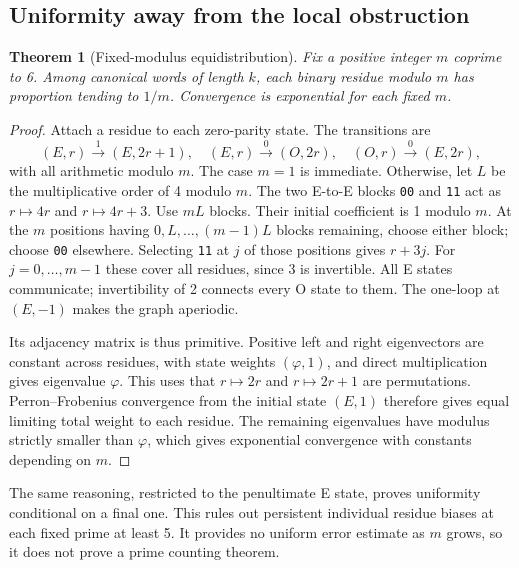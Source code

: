 \documentclass[11pt]{article}
\newtheorem{theorem}{Theorem}[section]
\theoremstyle{definition}\newtheorem{definition}[theorem]{Definition}
\newcommand{\ph}{\varphi}
\begin{document}
\subsection{Uniformity away from the local obstruction}
\begin{theorem}[Fixed-modulus equidistribution]
Fix a positive integer $m$ coprime to 6. Among canonical words of length
$k$, each binary residue modulo $m$ has proportion tending to $1/m$.
Convergence is exponential for each fixed $m$.
\end{theorem}
\begin{proof}
Attach a residue to each zero-parity state. The transitions are
\[
(E,r)\xrightarrow{1}(E,2r+1),\quad
(E,r)\xrightarrow{0}(O,2r),\quad
(O,r)\xrightarrow{0}(E,2r),
\]
with all arithmetic modulo $m$. The case $m=1$ is immediate. Otherwise,
let $L$ be the multiplicative order of 4 modulo $m$. The two E-to-E
blocks \texttt{00} and \texttt{11} act as $r\mapsto4r$ and
$r\mapsto4r+3$. Use $mL$ blocks. Their initial coefficient is 1 modulo
$m$. At the $m$ positions having $0,L,\ldots,(m-1)L$ blocks remaining,
choose either block; choose \texttt{00} elsewhere. Selecting \texttt{11}
at $j$ of those positions gives $r+3j$. For $j=0,\ldots,m-1$ these
cover all residues, since 3 is invertible. All E states communicate;
invertibility of 2 connects every O state to them. The one-loop at
$(E,-1)$ makes the graph aperiodic.

Its adjacency matrix is thus primitive. Positive left and right
eigenvectors are constant across residues, with state weights
$(\ph,1)$, and direct multiplication gives eigenvalue $\ph$.
This uses that $r\mapsto2r$ and $r\mapsto2r+1$ are permutations.
Perron--Frobenius convergence from the initial state $(E,1)$ therefore
gives equal limiting total weight to each residue. The remaining
eigenvalues have modulus strictly smaller than $\ph$, which gives
exponential convergence with constants depending on $m$.
\end{proof}
The same reasoning, restricted to the penultimate E state, proves
uniformity conditional on a final one. This rules out persistent
individual residue biases at each fixed prime at least 5. It provides
no uniform error estimate as $m$ grows, so it does not prove a prime
counting theorem.
\end{document}
